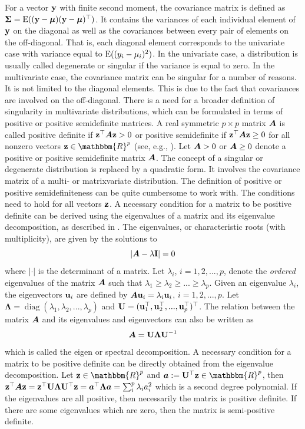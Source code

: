 \documentclass[12pt, oneside]{book}\usepackage{knitr}
\begin{document}
{For a vector $\mathbf{y}$ with finite second moment, the covariance matrix is defined as $\mathbf{\Sigma}=\operatorname{E}((\mathbf{y} - \mbox{\boldmath$\mu$})(\mathbf{y} - \mbox{\boldmath$\mu$})^\top)$. 
It contains the variances of each individual element of $\mathbf{y}$ on the diagonal as well as the covariances between every pair of elements on the off-diagonal. 
That is, each diagonal element corresponds to the univariate case with variance equal to $\operatorname{E}((y_i - \mu_i)^2)$. 
In the univariate case, a distribution is usually called degenerate or singular if the variance is equal to zero. 
In the multivariate case, the covariance matrix can be singular for a number of reasons. 
It is not limited to the diagonal elements.
This is due to the fact that covariances are involved on the off-diagonal.
There is a need for a broader definition of singularity in multivariate distributions, which can be formulated in terms of positive or positive semidefinite matrices. 
A real symmetric $p\times p$ matrix $\mbox{\boldmath$A$}$ is called positive definite if $\mathbf{z}^\top \mbox{\boldmath$A$} \mathbf{z} > 0$ or positive semidefinite if $\mathbf{z}^\top \mbox{\boldmath$A$} \mathbf{z} \geq 0$ for all nonzero vectors $\bz \in \mathbbm{R}^p$ (see, e.g., \citet[ch 14.2]{harville1997matrix}).
Let $\mbox{\boldmath$A$} > 0$ or $\mbox{\boldmath$A$} \geq 0$ denote a positive or positive semidefinite matrix $\mbox{\boldmath$A$}$. 
The concept of a singular or degenerate distribution is replaced by a quadratic form.
It involves the covariance matrix of a multi- or matrixvariate distribution.
The definition of positive or positive semidefiniteness can be quite cumbersome to work with. 
The conditions need to hold for all vectors $\mathbf{z}$. 
A necessary condition for a matrix to be positive definite can be derived using the eigenvalues of a matrix and its eigenvalue decomposition, as described in \citet[ch. 21]{harville1997matrix}.
The eigenvalues, or characteristic roots (with multiplicity), are given by the solutions to
\begin{equation}\label{def:eigenvalue} 
	\left|\mbox{\boldmath$A$} - \lambda \mathbf{I}\right| = 0
\end{equation}
where $|\cdot|$ is the determinant of a matrix.
Let $\lambda_i$, $i=1,2,...,p$, denote the \textit{ordered} eigenvalues of the matrix $\mbox{\boldmath$A$}$ such that $\lambda_1\geq \lambda_2 \geq ... \geq \lambda_p$.
Given an eigenvalue $\lambda_i$, the eigenvectors $\mathbf{u}_i$ are defined by $\mbox{\boldmath$A$} \mathbf{u}_i = \lambda_i \mathbf{u}_i$, $i=1,2,...,p$. 
Let $\boldsymbol{\Lambda} = \operatorname{diag}(\lambda_1, \lambda_2,...,\lambda_p)$ and $\mathbf{U}= (\mathbf{u}_1^\top, \mathbf{u}_2^\top, ..., \mathbf{u}_p^\top)^\top$. 
The relation between the matrix $\mbox{\boldmath$A$}$ and its eigenvalues and eigenvectors can also be written as 
\begin{equation}\label{eqn:eigenvalue_decomp}
	\mbox{\boldmath$A$} = \mathbf{U} \boldsymbol{\Lambda} \mathbf{U}^{-1}
\end{equation}
which is called the eigen or spectral decomposition.
A necessary condition for a matrix to be positive definite can be directly obtained from the eigenvalue decomposition. 
Let $\bz\in \mathbbm{R}^p$ and $\ba := \bU^{\top} \bz \in \mathbbm{R}^p$, then $\mathbf{z}^\top \mbox{\boldmath$A$} \mathbf{z} = \mathbf{z}^\top \mathbf{U} \boldsymbol{\Lambda} \mathbf{U} ^{\top} \mathbf{z} = \mbox{\boldmath$a$}^\top \boldsymbol{\Lambda} \mbox{\boldmath$a$} = \sum_i^p \lambda_i a_i^2$ which is a second degree polynomial. 
If the eigenvalues are all positive, then necessarily the matrix is positive definite. 
If there are some eigenvalues which are zero, then the matrix is semi-positive definite. 

}
\end{document}
